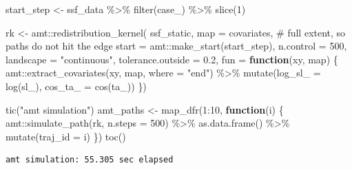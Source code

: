 \documentclass[
  letterpaper,
  DIV=11,
  numbers=noendperiod]{scrartcl}
\newenvironment{Shaded}{\begin{snugshade}}{\end{snugshade}}
\newcommand{\AttributeTok}[1]{\textcolor[rgb]{0.40,0.45,0.13}{#1}}
\newcommand{\CommentTok}[1]{\textcolor[rgb]{0.37,0.37,0.37}{#1}}
\newcommand{\ControlFlowTok}[1]{\textcolor[rgb]{0.00,0.23,0.31}{\textbf{#1}}}
\newcommand{\DecValTok}[1]{\textcolor[rgb]{0.68,0.00,0.00}{#1}}
\newcommand{\FloatTok}[1]{\textcolor[rgb]{0.68,0.00,0.00}{#1}}
\newcommand{\FunctionTok}[1]{\textcolor[rgb]{0.28,0.35,0.67}{#1}}
\newcommand{\NormalTok}[1]{\textcolor[rgb]{0.00,0.23,0.31}{#1}}
\newcommand{\OtherTok}[1]{\textcolor[rgb]{0.00,0.23,0.31}{#1}}
\newcommand{\SpecialCharTok}[1]{\textcolor[rgb]{0.37,0.37,0.37}{#1}}
\newcommand{\StringTok}[1]{\textcolor[rgb]{0.13,0.47,0.30}{#1}}
\begin{document}
\begin{Shaded}
\begin{Highlighting}[]
\NormalTok{start\_step }\OtherTok{\textless{}{-}}\NormalTok{ ssf\_data }\SpecialCharTok{\%\textgreater{}\%} \FunctionTok{filter}\NormalTok{(case\_) }\SpecialCharTok{\%\textgreater{}\%} \FunctionTok{slice}\NormalTok{(}\DecValTok{1}\NormalTok{)}

\NormalTok{rk }\OtherTok{\textless{}{-}}\NormalTok{ amt}\SpecialCharTok{::}\FunctionTok{redistribution\_kernel}\NormalTok{(}
\NormalTok{  ssf\_static,}
  \AttributeTok{map       =}\NormalTok{ covariates,                     }\CommentTok{\# full extent, so paths do not hit the edge}
  \AttributeTok{start     =}\NormalTok{ amt}\SpecialCharTok{::}\FunctionTok{make\_start}\NormalTok{(start\_step),}
  \AttributeTok{n.control =} \DecValTok{500}\NormalTok{,}
  \AttributeTok{landscape =} \StringTok{"continuous"}\NormalTok{,}
  \AttributeTok{tolerance.outside =} \FloatTok{0.2}\NormalTok{,}
  \AttributeTok{fun =} \ControlFlowTok{function}\NormalTok{(xy, map) \{}
\NormalTok{    amt}\SpecialCharTok{::}\FunctionTok{extract\_covariates}\NormalTok{(xy, map, }\AttributeTok{where =} \StringTok{"end"}\NormalTok{) }\SpecialCharTok{\%\textgreater{}\%}
      \FunctionTok{mutate}\NormalTok{(}\AttributeTok{log\_sl\_ =} \FunctionTok{log}\NormalTok{(sl\_), }\AttributeTok{cos\_ta\_ =} \FunctionTok{cos}\NormalTok{(ta\_))}
\NormalTok{  \})}

\FunctionTok{tic}\NormalTok{(}\StringTok{"amt simulation"}\NormalTok{)}
\NormalTok{amt\_paths }\OtherTok{\textless{}{-}} \FunctionTok{map\_dfr}\NormalTok{(}\DecValTok{1}\SpecialCharTok{:}\DecValTok{10}\NormalTok{, }\ControlFlowTok{function}\NormalTok{(i) \{}
\NormalTok{  amt}\SpecialCharTok{::}\FunctionTok{simulate\_path}\NormalTok{(rk, }\AttributeTok{n.steps =} \DecValTok{500}\NormalTok{) }\SpecialCharTok{\%\textgreater{}\%}
    \FunctionTok{as.data.frame}\NormalTok{() }\SpecialCharTok{\%\textgreater{}\%}
    \FunctionTok{mutate}\NormalTok{(}\AttributeTok{traj\_id =}\NormalTok{ i)}
\NormalTok{\})}
\FunctionTok{toc}\NormalTok{()}
\end{Highlighting}
\end{Shaded}

\begin{verbatim}
amt simulation: 55.305 sec elapsed
\end{verbatim}

\begin{Shaded}
\end{Shaded}
\end{document}
